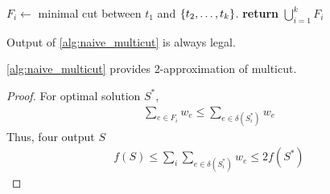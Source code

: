 \begin{algorithm}
	\caption{}\label{alg:naive_multicut}
	\begin{algorithmic}[1]
		\State $F_i \gets$ minimal cut between $t_1$ and $\qty{t_2,\dots, t_k}$.
		\EndFor
		\State \textbf{return} $\bigcup_{i=1}^k F_i$
		\EndProcedure
	\end{algorithmic}
\end{algorithm}

\begin{lemma}
	Output of \vref{alg:naive_multicut} is always legal.
\end{lemma}
\begin{lemma}
\vref{alg:naive_multicut} provides 2-approximation of multicut.
\begin{proof}
	For optimal solution $S^*$,
	\begin{align}
	\sum_{e\in F_i} w_e \leq \sum_{e\in \delta(S^*_i)} w_e
	\end{align}
	Thus, four output $S$
	\begin{align}
	f(S)  \leq \sum_i \sum_{e\in \delta(S^*_i)} w_e \leq 2f(S^*)
	\end{align}
\end{proof}
\end{lemma}
